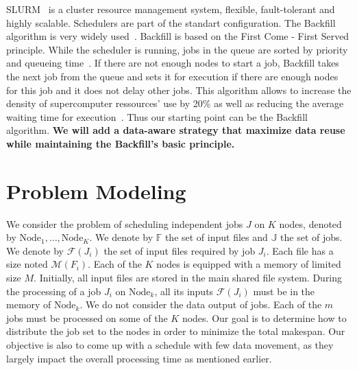 \documentclass[a4paper]{article}
\newcommand{\Node}[1]{\ensuremath{\mathrm{Node}_{#1}}\xspace}
\newcommand{\inputs}{\ensuremath{\mathcal{F}}\xspace}
\newcommand{\size}{\ensuremath{\mathcal{M}}\xspace}
\newcommand{\fileset}{\ensuremath{\mathbb{F}}\xspace}
\newcommand{\jobset}{\ensuremath{\mathbb{J}}\xspace}
\begin{document}
SLURM~\cite{SLURM} is a cluster resource management system, flexible, fault-tolerant and highly scalable.
Schedulers are part of the standart configuration. The Backfill algorithm is very widely used~\cite{New_Backfill}.
Backfill is based on the First Come - First Served principle. While the scheduler is running, jobs in the queue are sorted by priority and queueing time~\cite{New_Backfill}.
If there are not enough nodes to start a job, Backfill takes the next job from the queue and sets it for execution if there are enough nodes for this job and 
it does not delay other jobs.
This algorithm allows to increase the density of supercomputer ressources' use by 20\% as well as reducing the average waiting time
for execution~\cite{Maui_Scheduler}.
Thus our starting point can be the Backfill algorithm.
\textbf{We will add a data-aware strategy that maximize data reuse while maintaining the Backfill's basic principle.}

\section{Problem Modeling}
We consider the problem of scheduling independent jobs $J$ on $K$ nodes,
denoted by $\Node{1},\ldots, \Node{K}$. 
We denote by $\fileset$ the set of input files and $\jobset$ the set of jobs.
We denote by $\inputs(J_i)$ the set of input files required by job $J_i$. 
Each file has a size noted $\size(F_i)$.
Each of the $K$ nodes is equipped with a memory of limited size $M$. 
Initially, all input files are stored in the main shared file system.
During the processing of a job $J_i$ on $\Node{k}$, all its inputs
$\inputs(J_i)$ must be in the memory of $\Node{k}$. 
We do not consider the data output of jobs.
Each of the $m$ jobs must be processed on some of the $K$ nodes. 
Our goal is to determine how to distribute the job set to
the nodes in order to minimize the total makespan.
Our objective is also to come up with a schedule with
few data movement, as they largely impact the overall processing
time as mentioned earlier. 
\end{document}
